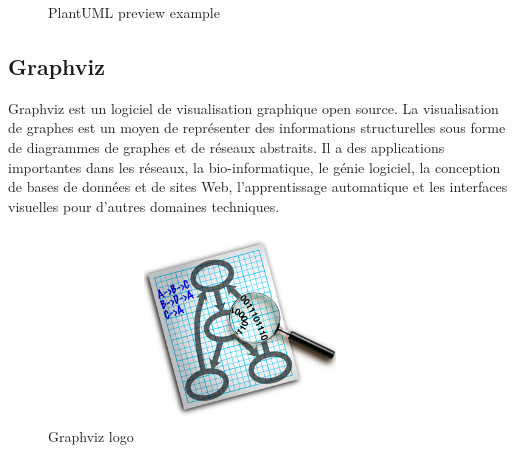 \documentclass[12pt]{report}
\begin{document}
\begin{figure}[h]
\centering
    \caption{PlantUML preview example}
\end{figure}

\vspace{-0.2in}
\subsection{Graphviz}
Graphviz est un logiciel de visualisation graphique open source. La visualisation de graphes est un moyen de représenter des informations structurelles sous forme de diagrammes de graphes et de réseaux abstraits. Il a des applications importantes dans les réseaux, la bio-informatique, le génie logiciel, la conception de bases de données et de sites Web, l'apprentissage automatique et les interfaces visuelles pour d'autres domaines techniques.

\begin{figure}[h]
\centering
    \includegraphics[width = 4in, height = 2in]{../Images/GraphvizLogo.png}
    \caption{Graphviz logo}
\end{figure}

\newpage
\end{document}
